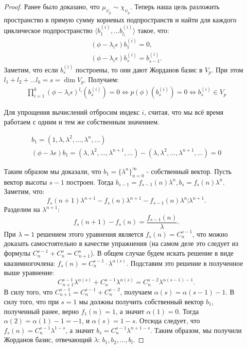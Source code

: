 \begin{proof}
    Ранее было доказано, что $\mu_{\psi_p} \sim \chi_{\psi_p}$. Теперь наша цель разложить пространство 
    в прямую сумму корневых подпространств и найти для каждого циклическое подпространство 
    $\langle b_1^{(i)}, \dots b_{l_i}^{(i)} \rangle$ такое, что:
    \begin{gather*}
        (\phi - \lambda_i \epsilon)b_1^{(i)} = 0, \\
        (\phi - \lambda_i \epsilon) b_{s}^{(i)} = b_{s-1}^{(i)}.
    \end{gather*}
    Заметим, что если $b_s^{(i)}$ построены, то они дают Жорданов базис в $V_p$. 
    При этом $l_1 + l_2 +\dots l_k = s = \dim V_p$. Получаем:
    \begin{gather*}
        \prod_{i=1}^{k}(\phi - \lambda_i \epsilon)^{l_i} (b_s^{(i)}) = 0 \Leftrightarrow p(\phi) (b_s^{(i)}) = 0 \Leftrightarrow b_s^{(i)} \in V_p
    \end{gather*}

    Для упрощения вычислений отбросим индекс $i$, считая, что мы всё время работаем с одним и тем же собственным значением.

    \begin{gather*}
        b_1 = (1, \lambda, \lambda^2, \dots, \lambda^n, \dots) \\
        (\phi - \lambda \epsilon)b_1 = (\lambda, \lambda^2, \dots, \lambda^{n + 1}, \dots) - (\lambda, \lambda^2, \dots, \lambda^{n + 1}, \dots) = 0
    \end{gather*}

    Таким образом мы доказали, что $b_1 = \{\lambda^n\}_{n=0}^{\infty}$ - собственный вектор.
    Пусть вектор высоты $s-1$ построен. Тогда $b_{s-1} = f_{s-1}(n) \lambda^n, b_s = f_s(n) \lambda^n$. Заметим, что: $$f_s(n+1) \lambda^{n+1} - f_s(n) \lambda^{n+1} - f_{s-1}(n) \lambda^{n} \vdots \lambda^{n + 1}.$$ Разделим на $\lambda^{n + 1}$: $$f_s(n+1) - f_s(n) = \frac{f_{s-1}(n)}{\lambda}.$$
    При $\lambda = 1$ решением этого уравнения является $f_s(n) = C_n^{s-1}$, что можно доказать 
    самостоятельно в качестве упражнения (на самом деле это следует из формулы $C_n^{s - 1} + C_n^s = C_{n + 1}^s$). В общем случае будем искать решение в виде квазимногочлена:
    $f_s(n) = C_n^{s-1} \cdot \lambda^{\alpha(s)}$. Подставим это решение в полученное выше уравнение:
    $$C_{n+1}^{s-1} \lambda^{\alpha(s)} + C_n^{s-1} \lambda^{\alpha(s)} 
    = C_n^{s-2} \lambda^{\alpha(s-1) - 1}.$$ В силу того, что $C_{n+1}^{s-1} = C_n^{s-1} + C_n^{s-2}$,
    получаем $\alpha(s) = \alpha(s-1) - 1$. В силу того, что при $s = 1$ мы должны получить собственный 
    вектор $b_1$, полученный ранее, верно $f_1(n) = 1$, а значит $\alpha(1) = 0$. 
    Тогда $\alpha(2) = \alpha(1) - 1 = -1$, и $\alpha(s) = 1 - s$. 
    Отсюда следует, что $f_s(n) = C_{n}^{s-1} \lambda^{1-s}$, а значит $b_s = C_{n}^{s-1} \lambda^{n+1-s}$.
    Таким образом, мы получили Жорданов базис, отвечающий $\lambda$: $b_1, b_2, \dots, b_l$.
\end{proof}